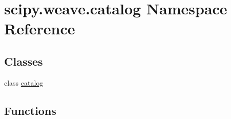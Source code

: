 \hypertarget{namespacescipy_1_1weave_1_1catalog}{}\section{scipy.\+weave.\+catalog Namespace Reference}
\label{namespacescipy_1_1weave_1_1catalog}
\subsection*{Classes}
\begin{DoxyCompactItemize}
\item 
class \hyperlink{classscipy_1_1weave_1_1catalog_1_1catalog}{catalog}
\end{DoxyCompactItemize}
\subsection*{Functions}
